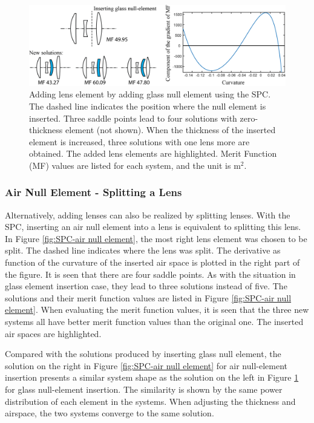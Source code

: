 \begin{figure}[h!]
    \centering
    \includegraphics[scale=0.68]{chapter-2/figures/spc_add_glass.png}
    \caption{Adding lens element by adding glass null element using the SPC. The dashed line indicates the position where the null element is inserted. Three saddle points lead to four solutions with zero-thickness element (not shown). When the thickness of the inserted element is increased, three solutions with one lens more are obtained. The added lens elements are highlighted. Merit Function (MF) values are listed for each system, and the unit is \textmu m$^2$. }
    \label{fig:SPC-glass null element}
\end{figure}

\subsubsection{Air Null Element - Splitting a Lens}

Alternatively, adding lenses can also be realized by splitting lenses. With the SPC, inserting an air null element into a lens is equivalent to splitting this lens. In Figure \ref{fig:SPC-air null element}, the most right lens element was chosen to be split. The dashed line indicates where the lens was split. The derivative as function of the curvature of the inserted air space is plotted in the right part of the figure. It is seen that there are four saddle points. As with the situation in glass element insertion case, they lead to three solutions instead of five. The solutions and their merit function values are listed in Figure \ref{fig:SPC-air null element}. When evaluating the merit function values, it is seen that the three new systems all have better merit function values than the original one. The inserted air spaces are highlighted.

Compared with the solutions produced by inserting glass null element, the solution on the right in Figure \ref{fig:SPC-air null element} for air null-element insertion presents a similar system shape as the solution on the left in Figure \ref{fig:SPC-glass null element} for glass null-element insertion. The similarity is shown by the same power distribution of each element in the systems. When adjusting the thickness and airspace, the two systems converge to the same solution. 


